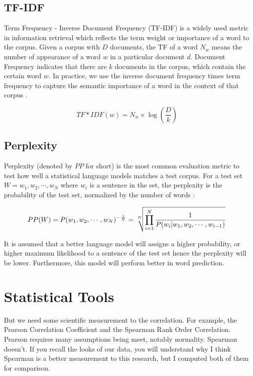 \subsection{TF-IDF}
Term Frequency - Inverse Document Frequency (TF-IDF) is a widely used metric in information retrieval which reflects the term weight or importance of a word to the corpus. Given a corpus with $D$ documents, the TF of a word $N_w$ means the number of appearance of a word $w$ in a particular document $d$. Document Frequency indicates that there are $k$ documents in the corpus, which contain the certain word $w$. In practice, we use the inverse document frequency times term frequency to capture the semantic importance of a word in the context of that corpus \citep{Jurafsky2008}.

\begin{equation}
TF*IDF(w) = N_w \times \log(\frac{D}{k})
\label{eq:tf-idf}
\end{equation}

\subsection{Perplexity}
Perplexity (denoted by $PP$ for short) is the most common evaluation metric to test how well a statistical language models matches a test corpus.  For a test set $W = {w_1, w_2, \cdots, w_N}$ where $w_i$ is a sentence in the set, the perplexity is the probability of the test set, normalized by the number of words \citep{Jurafsky2008}:

\begin{equation}
PP(W) = P(w_1, w_2, \cdots, w_N)^{-\frac{1}{N}}\\
= \sqrt[N]{\prod_{i=1}^{N} \frac{1}{P(w_i|w_1, w_2,\cdots, w_{i-1})}}
\label{eq:perplexity}
\end{equation}

It is assumed that a better language model will assigns a higher probability, or higher maximum likelihood to a sentence of the test set hence the perplexity will be lower. Furthermore, this model will perform better in word prediction.

\section{Statistical Tools}

But we need some scientific measurement to the correlation. For example, the Pearson Correlation Coefficient and the Spearman Rank Order Correlation. Pearson requires many assumptions being meet, notably normality. Spearman doesn’t. If you recall the looks of our data, you will understand why I think Spearman is a better measurement to this research, but I computed both of them for comparison.

